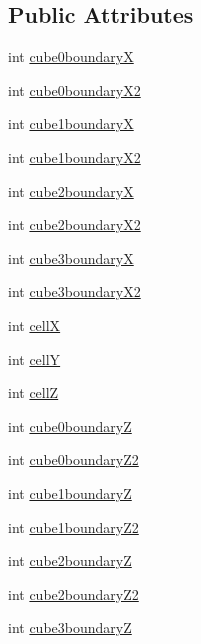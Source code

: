 \subsection*{Public Attributes}
\begin{DoxyCompactItemize}
\item 
int \hyperlink{classt_shape_opp_a2862f3eed71b35986b016c90c4b05789}{cube0boundary\-X}
\item 
int \hyperlink{classt_shape_opp_aa32382ad78df3bb4bc348615d0ddf861}{cube0boundary\-X2}
\item 
int \hyperlink{classt_shape_opp_afa127f50226a5f01e41b18c91c40cce8}{cube1boundary\-X}
\item 
int \hyperlink{classt_shape_opp_ab2f433b6dc6d22189a2a2f1c9e21bb20}{cube1boundary\-X2}
\item 
int \hyperlink{classt_shape_opp_aab0828a599cc0413a094f9a24c7fa1c6}{cube2boundary\-X}
\item 
int \hyperlink{classt_shape_opp_a0db9ec91d9aa41c32da9489b3a8b01e0}{cube2boundary\-X2}
\item 
int \hyperlink{classt_shape_opp_a3113171f6066946e0817dbb4a0778cab}{cube3boundary\-X}
\item 
int \hyperlink{classt_shape_opp_a26f9cbcb3f5690e3a7d93d3ac94fbadc}{cube3boundary\-X2}
\item 
int \hyperlink{classt_shape_opp_a756674e874a132a61a6fe042f0306cc6}{cell\-X}
\item 
int \hyperlink{classt_shape_opp_a7b383ccd61c7e9f6476dd74e34b747b3}{cell\-Y}
\item 
int \hyperlink{classt_shape_opp_a2e5cae84204ba6ffa6ac65adefd53655}{cell\-Z}
\item 
int \hyperlink{classt_shape_opp_ab87445197fb1652f5af61c8427bdfdf1}{cube0boundary\-Z}
\item 
int \hyperlink{classt_shape_opp_a73e00f928ce84f42cbb9732df4d0b434}{cube0boundary\-Z2}
\item 
int \hyperlink{classt_shape_opp_ad84f70c328391c2775a208953704cefb}{cube1boundary\-Z}
\item 
int \hyperlink{classt_shape_opp_a98286d5bc88ae6f7e44dd3b4a396bb2c}{cube1boundary\-Z2}
\item 
int \hyperlink{classt_shape_opp_a34e02802f83b7d5d08b6a3e76147fbd2}{cube2boundary\-Z}
\item 
int \hyperlink{classt_shape_opp_a95aaa0195ab9dbba7ffda5e90c313b21}{cube2boundary\-Z2}
\item 
int \hyperlink{classt_shape_opp_a899b1d8e9282327163c84c8bae66c1c0}{cube3boundary\-Z}

\end{DoxyCompactItemize}
